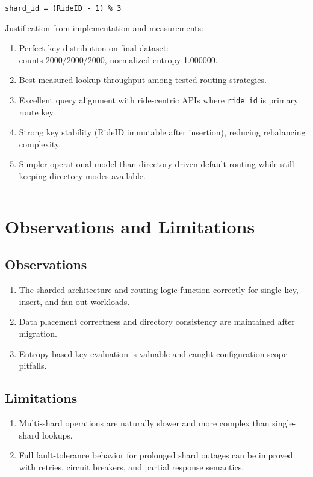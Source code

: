 \documentclass[12pt]{article}
\begin{document}
\texttt{shard\_id = (RideID - 1) \% 3}

Justification from implementation and measurements:
\begin{enumerate}
    \item Perfect key distribution on final dataset:\\
    counts 2000/2000/2000, normalized entropy 1.000000.

    \item Best measured lookup throughput among tested routing strategies.

    \item Excellent query alignment with ride-centric APIs where \texttt{ride\_id} is primary route key.

    \item Strong key stability (RideID immutable after insertion), reducing rebalancing complexity.

    \item Simpler operational model than directory-driven default routing while still keeping directory modes available.
\end{enumerate}

\hrule
\vspace{0.75em}

\section{Observations and Limitations}

\subsection{Observations}

\begin{enumerate}
    \item The sharded architecture and routing logic function correctly for single-key, insert, and fan-out workloads.
    \item Data placement correctness and directory consistency are maintained after migration.
    \item Entropy-based key evaluation is valuable and caught configuration-scope pitfalls.
\end{enumerate}

\subsection{Limitations}

\begin{enumerate}
    \item Multi-shard operations are naturally slower and more complex than single-shard lookups.
    \item Full fault-tolerance behavior for prolonged shard outages can be improved with retries, circuit breakers, and partial response semantics.
\end{enumerate}
\end{document}
